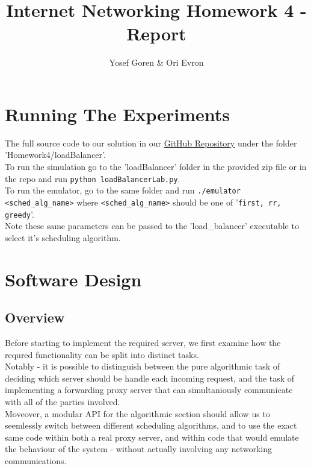 \documentclass{article}
\begin{document}
\author{Yosef Goren \& Ori Evron}
\title{Internet Networking Homework 4 - Report}
\maketitle
\tableofcontents

\section{Running The Experiments}
The full source code to our solution in our \href{https://github.com/yosefgoren/Internet-Networking-236341}{GitHub Repository}
under the folder 'Homework4/loadBalancer'.\\
To run the simulation go to the 'loadBalancer' folder in the provided zip file or in the repo
and run \texttt{python loadBalancerLab.py}.\\
To run the emulator, go to the same folder and run \texttt{./emulator <sched\_alg\_name>}
where \texttt{<sched\_alg\_name>} should be one of '\texttt{first, rr, greedy}'.\\
Note these same parameters can be passed to the 'load\_balancer' executable to select it's
scheduling algorithm.

\section{Software Design}
\subsection{Overview}
Before starting to implement the required server, we first examine
how the requred functionality can be split into distinct tasks.\\
Notably - it is possible to distinguish between the pure algorithmic task
of deciding which server should be handle each incoming request,
and the task of implementing a forwarding proxy server that can simultaniously communicate
with all of the parties involved.\\
Moveover, a modular API for the algorithmic section should allow us to
seemlessly switch between different scheduling algorithms, and to use the exact same code
within both a real proxy server, and within code that would emulate the behaviour of the system -
without actually involving any networking communications.\\
\end{document}
